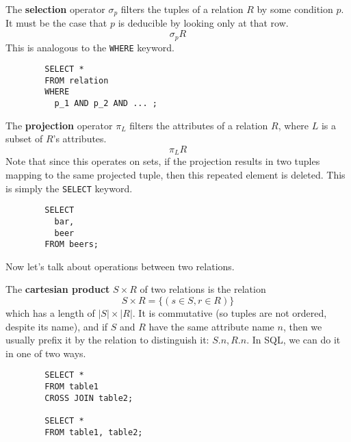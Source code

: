 \documentclass{article}
\begin{document}
    \begin{definition}[Selection]
      The \textbf{selection} operator $\sigma_p$ filters the tuples of a relation $R$ by some condition $p$. It must be the case that $p$ is deducible by looking only at that row. 
      \begin{equation}
        \sigma_p R
      \end{equation}
      This is analogous to the \texttt{WHERE} keyword. 
      \begin{lstlisting}
        SELECT * 
        FROM relation 
        WHERE 
          p_1 AND p_2 AND ... ; 
      \end{lstlisting}
    \end{definition}

    \begin{definition}[Projection]
      The \textbf{projection} operator $\pi_L$ filters the attributes of a relation $R$, where $L$ is a subset of $R$'s attributes. 
      \begin{equation}
        \pi_L R
      \end{equation}
      Note that since this operates on sets, if the projection results in two tuples mapping to the same projected tuple, then this repeated element is deleted. This is simply the \texttt{SELECT} keyword. 
      \begin{lstlisting}
        SELECT 
          bar,
          beer
        FROM beers; 
      \end{lstlisting}
    \end{definition}

    Now let's talk about operations between two relations. 

    \begin{definition}
      The \textbf{cartesian product} $S \times R$ of two relations is the relation 
      \begin{equation}
        S \times R = \{(s \in S, r \in R)\} 
      \end{equation}
      which has a length of $|S| \times |R|$. It is commutative (so tuples are not ordered, despite its name), and if $S$ and $R$ have the same attribute name $n$, then we usually prefix it by the relation to distinguish it: $S.n, R.n$. In SQL, we can do it in one of two ways. 
      \begin{lstlisting}
        SELECT *
        FROM table1
        CROSS JOIN table2; 

        SELECT *
        FROM table1, table2; 
      \end{lstlisting}
    \end{definition}
\end{document}
